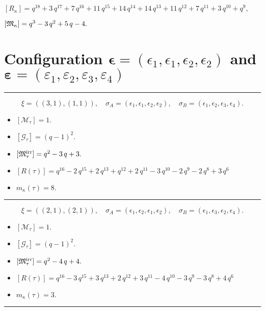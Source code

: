 \documentclass[10pt,a4paper]{amsart}
\begin{document}
${[R_{\kappa}]} = q^{18} + 3 \, q^{17} + 7 \, q^{16} + 11 \, q^{15} + 14 \, q^{14} + 14 \, q^{13} + 11 \, q^{12} + 7 \, q^{11} + 3 \, q^{10} + q^{9} ,$

${[{\frak M}_{\kappa}]} = q^{3} - 3 \, q^{2} + 5 \, q - 4 .$

\newpage{}

\section{Configuration $\bm{\epsilon} = (\epsilon_1,\epsilon_1,\epsilon_2,\epsilon_2)$ and $\bm{\varepsilon} =(\varepsilon_1,\varepsilon_2,\varepsilon_3,\varepsilon_4)$}
\noindent\rule{8cm}{0.4pt}

$$\xi = ({(3, 1), (1, 1)}),\quad \sigma_A = ({{\epsilon_1, \epsilon_1, \epsilon_2}, {\epsilon_2}}),\quad \sigma_B = ({{\epsilon_1, \epsilon_2, \epsilon_3}, {\epsilon_4}}).$$

\begin{itemize}
 \item $[\mathcal{M}_{\tau}] = 1 .$

 \item $[\mathcal{G}_{\tau}] = {\left(q - 1\right)}^{2} .$

 \item $[{\frak M}_{\tau}^{\textrm{irr}}] = q^{2} - 3 \, q + 3 .$

 \item $[R(\tau)] = q^{16} - 2 \, q^{15} + 2 \, q^{13} + q^{12} + 2 \, q^{11} - 3 \, q^{10} - 2 \, q^{9} - 2 \, q^{8} + 3 \, q^{6} $

 \item $m_{\kappa}(\tau) = 8 .$

 \end{itemize}
\noindent\rule{8cm}{0.4pt}

$$\xi = ({(2, 1), (2, 1)}),\quad \sigma_A = ({{\epsilon_1, \epsilon_2}, {\epsilon_1, \epsilon_2}}),\quad \sigma_B = ({{\epsilon_1, \epsilon_3}, {\epsilon_2, \epsilon_4}}).$$

\begin{itemize}
 \item $[\mathcal{M}_{\tau}] = 1 .$

 \item $[\mathcal{G}_{\tau}] = {\left(q - 1\right)}^{2} .$

 \item $[{\frak M}_{\tau}^{\textrm{irr}}] = q^{2} - 4 \, q + 4 .$

 \item $[R(\tau)] = q^{16} - 3 \, q^{15} + 3 \, q^{13} + 2 \, q^{12} + 3 \, q^{11} - 4 \, q^{10} - 3 \, q^{9} - 3 \, q^{8} + 4 \, q^{6} $

 \item $m_{\kappa}(\tau) = 3 .$

 \end{itemize}
\noindent\rule{8cm}{0.4pt}
\end{document}

